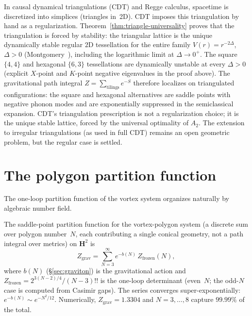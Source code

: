 \begin{remark}
\label{rmk:cdt}
In causal dynamical triangulations (CDT) and Regge calculus,
spacetime is discretized into simplices (triangles in~2D).
CDT imposes this triangulation by hand as a regularization.
Theorem~\ref{thm:triangle-universality} proves that the
triangulation is forced by stability: the triangular lattice
is the unique dynamically stable regular $2$D tessellation
for the entire family $V(r) = r^{-2\Delta}$, $\Delta > 0$
(Montgomery~\citeyear{Montgomery1988}), including the
logarithmic limit at $\Delta \to 0^+$.
The square $\{4,4\}$ and hexagonal $\{6,3\}$ tessellations
are dynamically unstable at every $\Delta > 0$ (explicit
$X$-point and $K$-point negative eigenvalues in the proof above).
The gravitational path integral
$Z = \sum_{\text{tilings}} e^{-S}$ therefore localizes on
triangulated configurations: the square and hexagonal
alternatives are saddle points with negative phonon modes
and are exponentially suppressed in the semiclassical
expansion.
CDT's triangulation prescription is not a regularization
choice; it is the unique stable lattice, forced by the
universal optimality of $A_2$.
The extension to irregular triangulations (as used in full
CDT) remains an open geometric problem, but the regular
case is settled.
\end{remark}


\section{The polygon partition function}
\label{sec:gravity-partition}

The one-loop partition function of the vortex system organizes
naturally by algebraic number field.

\begin{proposition}
\label{prop:gravity-partition}
The saddle-point partition function for the vortex-polygon system
(a discrete sum over polygon number~$N$, each contributing
a single conical geometry, not a path integral over metrics)
on $\mathbf{H}^2$ is
\begin{equation}\label{eq:Z-gravity}
  Z_{\mathrm{grav}} = \sum_{N=3}^{\infty}
  e^{-b(N)}\,Z_{\mathrm{frozen}}(N),
\end{equation}
where $b(N)$ (\S\ref{sec:graviton}) is the
gravitational action and $Z_{\mathrm{frozen}} = 2^{3(N-2)/4}/(N{-}3)!!$
is the one-loop determinant (even~$N$; the odd-$N$ case is computed
from Casimir gaps).
The series converges super-exponentially: $e^{-b(N)} \sim e^{-N^2/12}$.
Numerically, $Z_{\mathrm{grav}} = 1.3304$ and
$N = 3,\ldots,8$ capture $99.99\%$ of the total.
\end{proposition}

